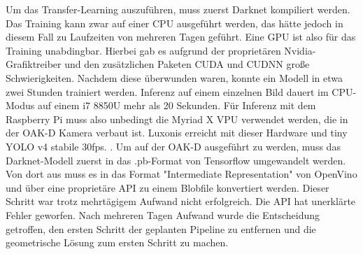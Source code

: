 Um das Transfer-Learning auszuführen, muss zuerst Darknet kompiliert werden. Das Training kann zwar auf einer CPU ausgeführt werden, das hätte jedoch in diesem Fall zu Laufzeiten von mehreren Tagen geführt. Eine GPU ist also für das Training unabdingbar.
Hierbei gab es aufgrund der proprietären Nvidia-Grafiktreiber und den zusätzlichen Paketen CUDA und CUDNN große Schwierigkeiten.
Nachdem diese überwunden waren, konnte ein Modell in etwa zwei Stunden trainiert werden. Inferenz auf einem einzelnen Bild dauert im CPU-Modus auf einem i7 8850U mehr als 20 Sekunden. Für Inferenz mit dem Raspberry Pi muss also unbedingt die Myriad X VPU verwendet werden, die in der OAK-D Kamera verbaut ist. Luxonis erreicht mit dieser Hardware und tiny YOLO v4 stabile 30fps. \autocite{Luxonis1}.
Um auf der OAK-D ausgeführt zu werden, muss das Darknet-Modell zuerst in das .pb-Format von Tensorflow umgewandelt werden.
Von dort aus muss es in das Format "Intermediate Representation" von OpenVino und über eine proprietäre API zu einem Blobfile konvertiert werden.
Dieser Schritt war trotz mehrtägigem Aufwand nicht erfolgreich. Die API hat unerklärte Fehler geworfen. Nach mehreren Tagen Aufwand wurde die Entscheidung getroffen, den ersten Schritt der geplanten Pipeline zu entfernen und die geometrische Lösung zum ersten Schritt zu machen.




